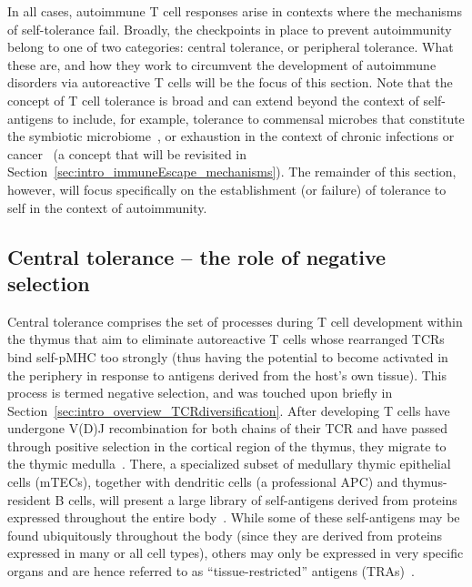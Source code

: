 In all cases, autoimmune T cell responses arise in contexts where the mechanisms of self-tolerance fail. Broadly, the checkpoints in place to prevent autoimmunity belong to one of two categories: central tolerance, or peripheral tolerance. What these are, and how they work to circumvent the development of autoimmune disorders via autoreactive T cells will be the focus of this section. Note that the concept of T cell tolerance is broad and can extend beyond the context of self-antigens to include, for example, tolerance to commensal microbes that constitute the symbiotic microbiome~\cite{nutsch2012t}, or exhaustion in the context of chronic infections or cancer~\cite{schietinger2014tolerance} (a concept that will be revisited in Section~\ref{sec:intro_immuneEscape_mechanisms}). The remainder of this section, however, will focus specifically on the establishment (or failure) of tolerance to self in the context of autoimmunity.

\subsection{Central tolerance -- the role of negative selection}
\label{sec:intro_autoimmunity_centralTolerance}

Central tolerance comprises the set of processes during T cell development within the thymus that aim to eliminate autoreactive T cells whose rearranged TCRs bind self-pMHC too strongly (thus having the potential to become activated in the periphery in response to antigens derived from the host's own tissue). This process is termed negative selection, and was touched upon briefly in Section~\ref{sec:intro_overview_TCRdiversification}.  After developing T cells have undergone V(D)J recombination for both chains of their TCR and have passed through positive selection in the cortical region of the thymus, they migrate to the thymic medulla~\cite{takahama2006journey,love2011signal}. There, a specialized subset of medullary thymic epithelial cells (mTECs), together with dendritic cells (a professional APC) and thymus-resident B cells, will present a large library of self-antigens derived from proteins expressed throughout the entire body~\cite{klein2014positive,takahama2006journey,love2011signal,castaneda2021multifaceted}. While some of these self-antigens may be found ubiquitously throughout the body (since they are derived from proteins expressed in many or all cell types), others may only be expressed in very specific organs and are hence referred to as ``tissue-restricted'' antigens (TRAs)~\cite{kyewski2006central,kondo2019thymus}.

